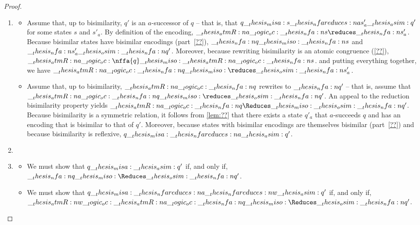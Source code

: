\begin{proof}
\begin{enumerate}
\begin{itemize}
\begin{itemize}[listparindent=\parindent]
\begin{itemize}
        \end{itemize}
      \end{itemize}
      
    \end{itemize}

  \item 
    \begin{itemize}
    \item Assume that, up to bisimilarity, $q'$ is an $a$-successor of $q$ -- that is, that $q \misa s \nfareduces[a] s'_a \asim q'$ for some states $s$ and $s'_a$.
      By definition of the encoding, $\atmR{a} \oc \nfa{s} \reduces \nfa{s}'_a$.
      Because bisimilar states have bisimilar encodings (part~\ref{??}), $\__thesis_nfa:n {q} \__thesis_miso: \__thesis_nfa:n {s}$ and $\__thesis_nfa:n {s}'_a \__thesis_osim: \__thesis_nfa:n {q}'$.
      Moreover, because rewriting bisimilarity is an atomic congruence (\cref{??}), $\atmR{a} \oc \nffa{q} \miso \atmR{a} \oc \nfa{s}$.
      and putting everything together, we have $\atmR{a} \oc \nfa{q} \miso\reduces\osim \nfa{s}'_a$.

    \item Assume that, up to bisimilarity, $\__thesis_atmR:n {a} \__logic_oc: \__thesis_nfa:n {q}$ rewrites to $\__thesis_nfa:n {q}'$ -- that is, assume that $\atmR{a} \oc \nfa{q} \miso\reduces\osim \nfa{q}'$.
      An appeal to the reduction bisimilarity property yields $\atmR{a} \oc \nfa{q} \Reduces\miso\osim \nfa{q}'$.
      Because bisimilarity is a symmetric relation, it follows from \cref{lem:??} that there exists a state $q'_a$ that $a$-succeeds $q$ and has an encoding that is bisimilar to that of $q'$.
      Moreover, because states with bisimilar encodings are themselves bisimilar (part~\ref{??}) and because bisimilarity is reflexive, $q \misa\nfareduces[a]\asim q'$.
    \end{itemize}

  \item
  \item 
    \begin{itemize}
    \item We must show that $q \__thesis_misa:\__thesis_asim: q'$ if, and only if, $\nfa{q} \miso\Reduces\osim \nfa{q}'$.
    \item We must show that $q \misa\nfareduces[a]\nfareduces[w]\asim q'$ if, and only if, $\atmR{w} \oc \atmR{a} \oc \nfa{q} \miso\Reduces\osim \nfa{q}'$.
      
    \end{itemize}
  \end{enumerate}


\end{proof}
